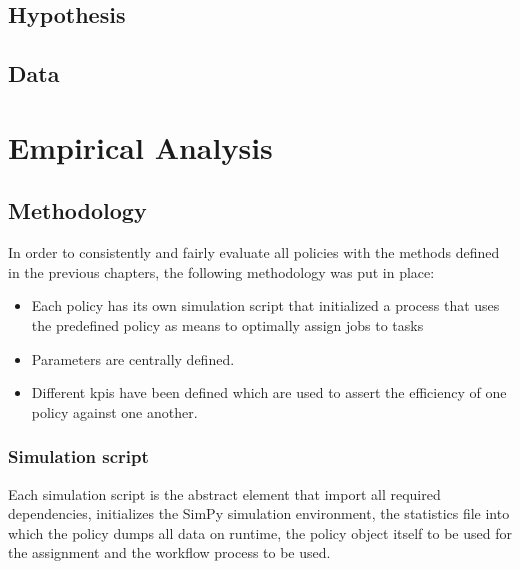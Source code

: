 \documentclass{seal_thesis}
\begin{document}
\section{Hypothesis}
\section{Data}

\chapter{Empirical Analysis}
\label{ch:empirical_analysis}

\section{Methodology}

In order to consistently and fairly evaluate all policies with the methods defined in the previous chapters, the following methodology was put in place:

\begin{itemize}
	\item Each policy has its own simulation script that initialized a process that uses the predefined policy as means to optimally assign jobs to tasks
	\item Parameters are centrally defined.
	\item Different \glspl{kpi} have been defined which are used to assert the efficiency of one policy against one another.
\end{itemize}

\subsection{Simulation script}

Each simulation script is the abstract element that import all required dependencies, initializes the SimPy simulation environment, the statistics file into which the policy dumps all data on runtime, the policy object itself to be used for the assignment and the workflow process to be used. 
\end{document}
